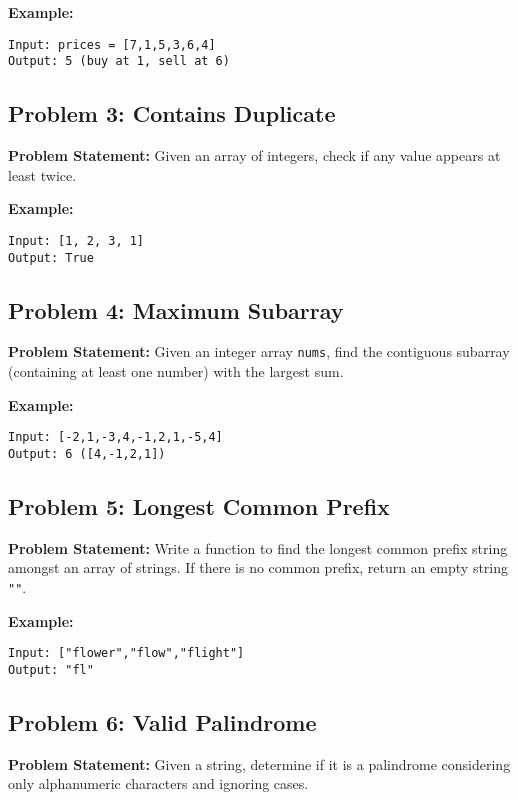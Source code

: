 \documentclass[12pt]{article}
\begin{document}
\textbf{Example:}
\begin{verbatim}
Input: prices = [7,1,5,3,6,4]
Output: 5 (buy at 1, sell at 6)
\end{verbatim}


\vspace{1cm}

\subsection*{Problem 3: Contains Duplicate}
\textbf{Problem Statement:} Given an array of integers, check if any value appears at least twice.

\textbf{Example:}
\begin{verbatim}
Input: [1, 2, 3, 1]
Output: True
\end{verbatim}


\vspace{1cm}

\subsection*{Problem 4: Maximum Subarray}
\textbf{Problem Statement:} Given an integer array \texttt{nums}, find the contiguous subarray (containing at least one number) with the largest sum.

\textbf{Example:}
\begin{verbatim}
Input: [-2,1,-3,4,-1,2,1,-5,4]
Output: 6 ([4,-1,2,1])
\end{verbatim}


\vspace{1cm}

\subsection*{Problem 5: Longest Common Prefix}
\textbf{Problem Statement:} Write a function to find the longest common prefix string amongst an array of strings. If there is no common prefix, return an empty string \texttt{""}.

\textbf{Example:}
\begin{verbatim}
Input: ["flower","flow","flight"]
Output: "fl"
\end{verbatim}


\vspace{1cm}

\subsection*{Problem 6: Valid Palindrome}
\textbf{Problem Statement:} Given a string, determine if it is a palindrome considering only alphanumeric characters and ignoring cases.
\end{document}
